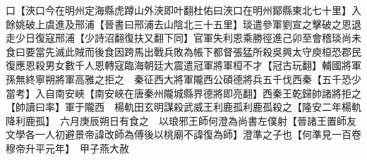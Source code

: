 口【浹口今在明州定海縣虎蹲山外浹即叶翻杜佑曰浹口在明州鄮縣東北七十里】入餘姚破上虞進及邢浦【晉書曰邢浦去山陰北三十五里】琰遣參軍劉宣之擊破之恩退走少日復寇邢浦【少詩沼翻復扶又翻下同】官軍失利恩乘勝徑進己卯至會稽琰尚未食曰要當先滅此賊而後食因跨馬出戰兵敗為帳下都督張猛所殺吳興太守庾桓恐郡民復應恩殺男女數千人恩轉寇臨海朝廷大震遣冠軍將軍桓不才【冠古玩翻】輔國將軍孫無終寧朔將軍高雅之拒之　秦征西大將軍隴西公碩德將兵五千伐西秦【五千恐少當考】入自南安峽【南安峽在唐秦州隴城縣界德將即亮翻】西秦王乾歸帥諸將拒之【帥讀曰率】軍于隴西　楊軌田玄明謀殺武威王利鹿孤利鹿孤殺之【隆安二年楊軌降利鹿孤】　六月庚辰朔日有食之　以琅邪王師何澄為尚書左僕射【晉諸王置師友文學各一人初避景帝諱改師為傅後以桃廟不諱復為師】澄準之子也【何準見一百卷穆帝升平元年】　甲子燕大赦　